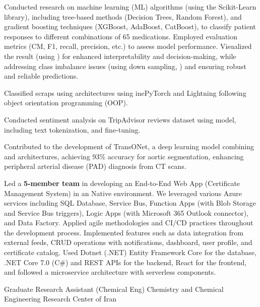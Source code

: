 \begin{cventries}
{\begin{cvitemsfree}
                \item{Conducted research on machine learning (ML) algorithms (using the Scikit-Learn library), including tree-based methods (Decision Trees, Random Forest), and gradient boosting techniques (XGBoost, AdaBoost, CatBoost), to classify patient responses to different combinations of 65 medications. Employed evaluation metrics (CM, F1, recall, precision, etc.) to assess model performance. Visualized the result (using ) for enhanced interpretability and decision-making, while addressing class imbalance issues (using down sampling, ) and ensuring robust and reliable predictions.}
                \item{Classified scraps using  architectures using \myul  ine{PyTorch and Lightning} following object orientation programming (OOP).}
                \item{Conducted sentiment analysis on TripAdvisor reviews dataset using  model, including text tokenization, and fine-tuning.}
                \item{Contributed to the development of TransONet, a deep learning model combining  and  architectures, achieving 93\% accuracy for aortic segmentation, enhancing peripheral arterial disease (PAD) diagnosis from CT scans.}
                \item{Led a \textbf{5-member team} in developing an End-to-End Web App (Certificate Management System) in an  Native environment. We leveraged various Azure services including SQL Database, Service Bus, Function Apps (with Blob Storage and Service Bus triggers), Logic Apps (with Microsoft 365 Outlook connector), and Data Factory. Applied agile methodologies and CI/CD practices throughout the development process. Implemented features such as data integration from external feeds, CRUD operations with notifications, dashboard, user profile, and certificate catalog. Used Dotnet (.NET) Entity Framework Core for the database, .NET Core 7.0 (C\#) and REST APIs for the backend, React for the frontend, and followed a microservice architecture with serverless components.}
            \end{cvitemsfree}
        }
    \cventry
        {Graduate Research Assistant (Chemical Eng)} %
        {Chemistry and Chemical Engineering Research Center of Iran} %

\end{cventries}
